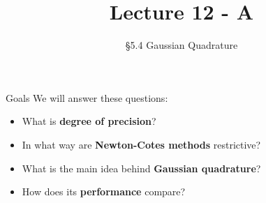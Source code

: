 \documentclass[10pt]{beamer}
\title[Math/CS 375]{Lecture 12 - A}
\subtitle{ \S 5.4 Gaussian Quadrature}
\begin{document}
\begin{frame}
  \titlepage
\end{frame}

\begin{frame}{Goals}
We will answer these questions:\\[3mm]
\begin{itemize}
    \item What is \textbf{degree of precision}?
    \item In what way are \textbf{Newton-Cotes methods} restrictive?
    \item What is the main idea behind \textbf{Gaussian quadrature}?
    \item How does its \textbf{performance} compare?
\end{itemize}
\end{frame}
\end{document}
